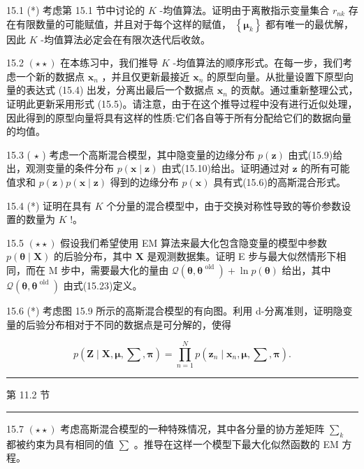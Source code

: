 \documentclass[10pt]{article}
\newcommand{\HRule}{\begin{center}\rule{0.9\linewidth}{0.2mm}\end{center}}
\begin{document}
15.1 (*) 考虑第 15.1 节中讨论的 \(K\) -均值算法。证明由于离散指示变量集合 \({r}_{nk}\) 存在有限数量的可能赋值，并且对于每个这样的赋值， \(\left\{  {\mathbf{\mu }}_{k}\right\}\) 都有唯一的最优解，因此 \(K\) -均值算法必定会在有限次迭代后收敛。

15.2 \(\left( {\star  \star  }\right)\) 在本练习中，我们推导 \(K\) -均值算法的顺序形式。在每一步，我们考虑一个新的数据点 \({\mathbf{x}}_{n}\) ，并且仅更新最接近 \({\mathbf{x}}_{n}\) 的原型向量。从批量设置下原型向量的表达式 (15.4) 出发，分离出最后一个数据点 \({\mathbf{x}}_{n}\) 的贡献。通过重新整理公式，证明此更新采用形式 (15.5)。请注意，由于在这个推导过程中没有进行近似处理，因此得到的原型向量将具有这样的性质:它们各自等于所有分配给它们的数据向量的均值。

15.3 ( \(\star\) ) 考虑一个高斯混合模型，其中隐变量的边缘分布 \(p\left( \mathbf{z}\right)\) 由式(15.9)给出，观测变量的条件分布 \(p\left( {\mathbf{x} \mid  \mathbf{z}}\right)\) 由式(15.10)给出。证明通过对 \(\mathbf{z}\) 的所有可能值求和 \(p\left( \mathbf{z}\right) p\left( {\mathbf{x} \mid  \mathbf{z}}\right)\) 得到的边缘分布 \(p\left( \mathbf{x}\right)\) 具有式(15.6)的高斯混合形式。

15.4 (*) 证明在具有 \(K\) 个分量的混合模型中，由于交换对称性导致的等价参数设置的数量为 \(K\) !。

15.5 \(\left( {\star  \star  }\right)\) 假设我们希望使用 EM 算法来最大化包含隐变量的模型中参数 \(p\left( {\mathbf{\theta } \mid  \mathbf{X}}\right)\) 的后验分布，其中 \(\mathbf{X}\) 是观测数据集。证明 E 步与最大似然情形下相同，而在 \(\mathrm{M}\) 步中，需要最大化的量由 \(\mathcal{Q}\left( {\mathbf{\theta },{\mathbf{\theta }}^{\text{ old }}}\right)  + \ln p\left( \mathbf{\theta }\right)\) 给出，其中 \(\mathcal{Q}\left( {\mathbf{\theta },{\mathbf{\theta }}^{\text{ old }}}\right)\) 由式(15.23)定义。

15.6 (*) 考虑图 15.9 所示的高斯混合模型的有向图。利用 d-分离准则，证明隐变量的后验分布相对于不同的数据点是可分解的，使得

\[
p\left( {\mathbf{Z} \mid  \mathbf{X},\mathbf{\mu },\mathbf{\sum },\mathbf{\pi }}\right)  = \mathop{\prod }\limits_{{n = 1}}^{N}p\left( {{\mathbf{z}}_{n} \mid  {\mathbf{x}}_{n},\mathbf{\mu },\mathbf{\sum },\mathbf{\pi }}\right) . \tag{15.62}
\]

\HRule

第 11.2 节

\HRule

15.7 \(\left( {\star  \star  }\right)\) 考虑高斯混合模型的一种特殊情况，其中各分量的协方差矩阵 \({\mathbf{\sum }}_{k}\) 都被约束为具有相同的值 \(\mathbf{\sum }\) 。推导在这样一个模型下最大化似然函数的 EM 方程。
\end{document}
